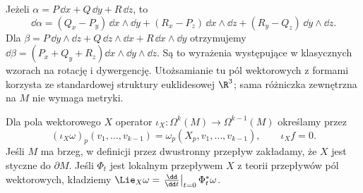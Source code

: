 \begin{przyklad}[Rachunek na $\R^3$]
Jeżeli $\alpha=P\,\dd x+Q\,\dd y+R\,\dd z$, to
\[
 \dd\alpha=(Q_x-P_y)\,\dd x\wedge\dd y
 +(R_x-P_z)\,\dd x\wedge\dd z
 +(R_y-Q_z)\,\dd y\wedge\dd z.
\]
Dla $\beta=P\,\dd y\wedge\dd z
+Q\,\dd z\wedge\dd x+R\,\dd x\wedge\dd y$
otrzymujemy $\dd\beta=(P_x+Q_y+R_z)
\dd x\wedge\dd y\wedge\dd z$.
Są to wyrażenia występujące w klasycznych wzorach na rotację
i dywergencję. Utożsamianie tu pól wektorowych z formami
korzysta ze standardowej struktury euklidesowej $\R^3$;
sama różniczka zewnętrzna na $M$ nie wymaga metryki.
\end{przyklad}

\begin{definicja}
\label{def:formy-kontrakcja-lie}
Dla pola wektorowego $X$ operator
$\iota_X:\Omega^k(M)\to\Omega^{k-1}(M)$ określamy przez
\[
 (\iota_X\omega)_p(v_1,\ldots,v_{k-1})
 =\omega_p(X_p,v_1,\ldots,v_{k-1}),
 \qquad \iota_Xf=0.
\]
Jeśli $M$ ma brzeg, w definicji przez dwustronny przepływ
zakładamy, że $X$ jest styczne do $\partial M$.
Jeśli $\Phi_t$ jest lokalnym przepływem $X$ z teorii przepływów pól wektorowych, kładziemy
$\Lie_X\omega=\left.\frac{\dd}{\dd t}\right|_{t=0}\Phi_t^*\omega$.
\end{definicja}

